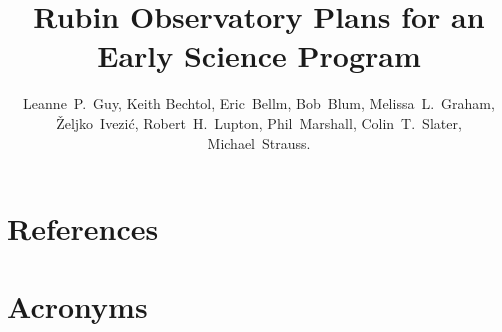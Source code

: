 \documentclass[DM,authoryear,toc,lsstdraft]{lsstdoc}
\title{Rubin Observatory Plans for an Early Science Program}
\author{%
Leanne~P.~Guy, Keith Bechtol, Eric~Bellm, Bob~Blum, Melissa~L.~Graham,
\v{Z}eljko~Ivezi\'{c}, Robert~H.~Lupton, Phil~Marshall, Colin~T.~Slater, Michael~Strauss.}
\date{\vcsDate}
\begin{document}
\maketitle

%









\appendix
\section{References} \label{sec:bib}
\renewcommand{\refname}{} %


\section{Acronyms} \label{sec:acronyms}

\end{document}
